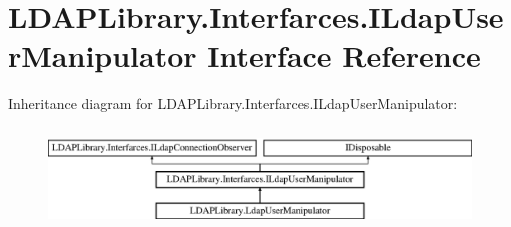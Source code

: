 \hypertarget{interface_l_d_a_p_library_1_1_interfarces_1_1_i_ldap_user_manipulator}{}\section{L\+D\+A\+P\+Library.\+Interfarces.\+I\+Ldap\+User\+Manipulator Interface Reference}
\label{interface_l_d_a_p_library_1_1_interfarces_1_1_i_ldap_user_manipulator}
Inheritance diagram for L\+D\+A\+P\+Library.\+Interfarces.\+I\+Ldap\+User\+Manipulator\+:\begin{figure}[H]
\begin{center}
\leavevmode
\includegraphics[height=2.692308cm]{interface_l_d_a_p_library_1_1_interfarces_1_1_i_ldap_user_manipulator}
\end{center}
\end{figure}
